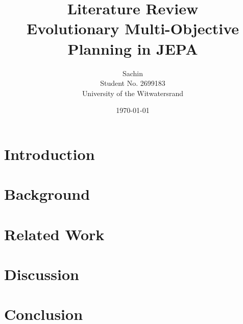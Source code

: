 \documentclass[11pt,a4paper]{article}
\title{Literature Review\\[0.5em]
  \large Evolutionary Multi-Objective Planning in JEPA}
\author{Sachin \\ Student No. 2699183 \\ University of the Witwatersrand}
\date{\today}
\begin{document}
\maketitle

\begin{abstract}
\end{abstract}

\section{Introduction}

\section{Background}

\section{Related Work}

\section{Discussion}

\section{Conclusion}

\printbibliography[title={References}]
\end{document}
